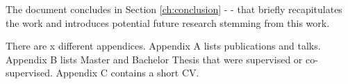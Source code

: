 

The document concludes in Section \ref{ch:conclusion} - \emph{} - that briefly recapitulates the work and introduces potential future research stemming from this work.

There are x different appendices. Appendix A lists publications and talks. Appendix B lists Master and Bachelor Thesis that were supervised or co-supervised. Appendix C contains a short CV.